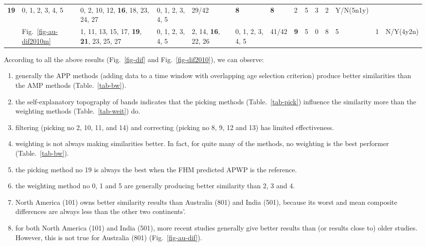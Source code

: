 \begin{table*}
{\begin{tabular}{l|l|l|l|l|l|l|l|l|l|l|l|l|l}
{{  \textbf{19}}} & \multirow{2}{*}{\parbox{1cm}{0, 1, 2, 3, 4, 5}} &
  \multirow{2}{*}{\parbox{2.4cm}{0, 2, 10, 12, \textbf{16}, 18, 23, 24, 27}} &
  \multirow{2}{*}{\parbox{1cm}{0, 1, 2, 3, 4, 5}} & 29/42 & \textbf{8} & \textbf{8} & 2 & 5 & 3
  & 2 & Y/N(5n1y) \\ \\ \cline{2-14}
& Fig.~\ref{fig-au-dif2010m} & \multirow{2}{*}{\parbox{2cm}{1, 11, 13, 15, 17,
  \textbf{19}, \textbf{21}, 23, 25, 27}} & \multirow{2}{*}{\parbox{1cm}{0, 1, 2, 3, 4, 5}} &
  \multirow{2}{*}{\parbox{2cm}{2, 14, \textbf{16}, 22, 26}} &
  \multirow{2}{*}{\parbox{1cm}{0, 1, 2, 3, 4, 5}} & 41/42 & \textbf{9} & 5 & 0 & 8 & 5
  & 1 & N/Y(4y2n)
\end{tabular}%
}
\end{table*}

According to all the above results (Fig.~\ref{fig-dif} and
Fig.~\ref{fig-dif2010}), we can observe:
%
\begin{enumerate}
  \item generally the APP methods (adding data to a time window with overlapping
        age selection criterion) produce better similarities than the AMP
        methods (Table.~\ref{tab-bw}).
  \item the self-explanatory topography of bands indicates that the picking
        methods (Table.~\ref{tab-pick}) influence the similarity more than the
        weighting methods (Table.~\ref{tab-weit}) do.
  \item filtering (picking no 2, 10, 11, and 14) and
        correcting (picking no 8, 9, 12 and 13) has limited effectiveness.
  \item weighting is not always making similarities better. In fact, for quite
        many of the methods, no weighting is the best performer
		(Table.~\ref{tab-bw}).
  \item the picking method no 19 is always the best when the FHM predicted APWP
		is the reference.
  \item the weighting method no 0, 1 and 5 are generally producing better
        similarity than 2, 3 and 4.
  \item North America (101) owns better similarity results than Australia (801)
        and India (501), because its worst and mean composite differences are
		always less than the other two continents'.
  \item for both North America (101) and India (501), more recent studies
        generally give better results than (or results close to) older studies.
		However, this is not true for Australia (801) (Fig.~\ref{fig-au-dif}).
\end{enumerate}

